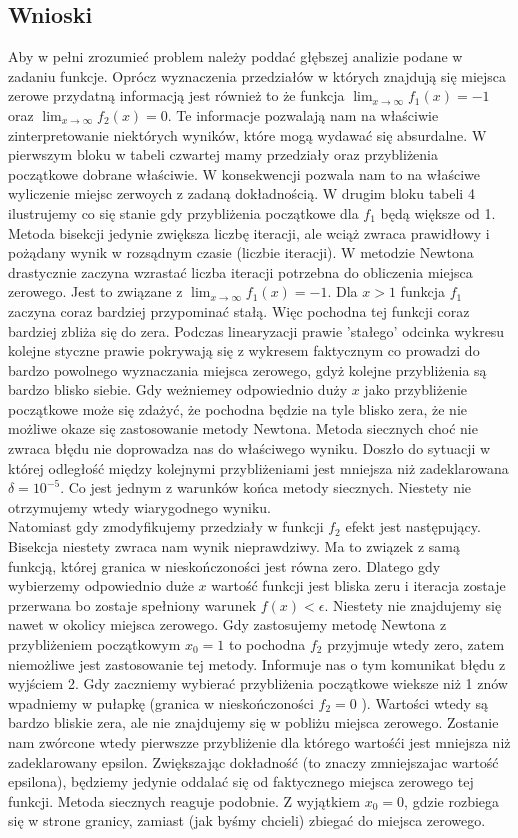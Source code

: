\documentclass[]{article}
\begin{document}
\subsection{Wnioski}
Aby w pełni zrozumieć problem należy poddać głębszej analizie podane w zadaniu funkcje. Oprócz wyznaczenia przedziałów w których znajdują się miejsca zerowe przydatną informacją jest również to że funkcja $\lim_{x\to\infty} f_1(x) = -1$ oraz $\lim_{x\to\infty} f_2(x) = 0$. Te informacje pozwalają nam na właściwie zinterpretowanie niektórych wyników, które mogą wydawać się absurdalne. W pierwszym bloku w tabeli czwartej mamy przedziały oraz przybliżenia początkowe dobrane właściwie. W konsekwencji pozwala nam to na właściwe wyliczenie miejsc zerwoych z zadaną dokładnością. W drugim bloku tabeli 4 ilustrujemy co się stanie gdy przybliżenia początkowe dla $f_1$ będą większe od 1. Metoda bisekcji jedynie zwiększa liczbę iteracji, ale wciąż zwraca prawidłowy i pożądany wynik w rozsądnym czasie (liczbie iteracji). W metodzie Newtona drastycznie zaczyna wzrastać liczba iteracji potrzebna do obliczenia miejsca zerowego. Jest to związane z $\lim_{x\to\infty} f_1(x) = -1$. Dla $x>1$ funkcja $f_1$ zaczyna coraz bardziej przypominać stałą. Więc pochodna tej funkcji coraz bardziej zbliża się do zera. Podczas linearyzacji prawie 'stałego' odcinka wykresu kolejne styczne prawie pokrywają się z wykresem faktycznym co prowadzi do bardzo powolnego wyznaczania miejsca zerowego, gdyż kolejne przybliżenia są bardzo blisko siebie. Gdy weżniemey odpowiednio duży $x$ jako przybliżenie początkowe może się zdażyć, że pochodna będzie na tyle blisko zera, że nie możliwe okaze się zastosowanie metody Newtona. Metoda siecznych choć nie zwraca błędu nie doprowadza nas do właściwego wyniku. Doszło do sytuacji w której odległość między kolejnymi przybliżeniami jest mniejsza niż zadeklarowana $\delta = 10 ^{-5}$. Co jest jednym z warunków końca metody siecznych. Niestety nie otrzymujemy wtedy wiarygodnego wyniku.
\\Natomiast gdy zmodyfikujemy przedziały w funkcji $f_2$ efekt jest następujący. Bisekcja niestety zwraca nam wynik nieprawdziwy. Ma to związek z samą funkcją, której granica w nieskończoności jest równa zero. Dlatego gdy wybierzemy odpowiednio duże $x$ wartość funkcji jest bliska zeru i iteracja zostaje przerwana bo zostaje spełniony warunek $f(x) < \epsilon$. Niestety nie znajdujemy się nawet w okolicy miejsca zerowego. Gdy zastosujemy metodę Newtona z przybliżeniem początkowym $x_0 = 1$ to pochodna $f_2$ przyjmuje wtedy zero, zatem niemożliwe jest zastosowanie tej metody. Informuje nas o tym komunikat błędu z wyjściem 2. Gdy zaczniemy wybierać przybliżenia początkowe wieksze niż 1 znów wpadniemy w pułapkę (granica w nieskończoności $f_2 = 0$ ). Wartości wtedy są bardzo bliskie zera, ale nie znajdujemy się w pobliżu miejsca zerowego. Zostanie nam zwórcone wtedy pierwszze przybliżenie dla którego wartośći jest mniejsza niż zadeklarowany epsilon. Zwiększając dokładność (to znaczy zmniejszajac wartość epsilona), będziemy jedynie oddalać się od faktycznego miejsca zerowego tej funkcji. Metoda siecznych reaguje podobnie. Z wyjątkiem $x_0 = 0$, gdzie rozbiega się w strone granicy, zamiast (jak byśmy chcieli) zbiegać do miejsca zerowego.
\end{document}
